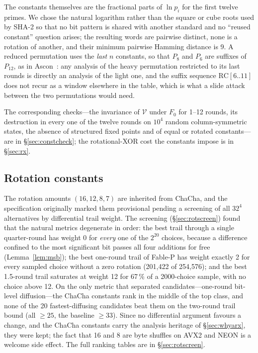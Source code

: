 \documentclass{iacrtrans}
\newcommand{\FableP}{\textsf{Fable-P}\xspace}
\newcommand{\ChaCha}{\textsf{ChaCha}\xspace}
\newcommand{\PP}[1]{P_{#1}}
\newcommand{\WuncTwo}{33}    %
\begin{document}
The constants themselves are the fractional parts of $\ln p_i$ for the first twelve primes. We chose the natural logarithm rather than the square or cube roots used by SHA-2 so that no bit pattern is shared with another standard and no ``reused constant'' question arises; the resulting words are pairwise distinct, none is a rotation of another, and their minimum pairwise Hamming distance is 9. A reduced permutation uses the \emph{last} $n$ constants, so that $\PP{8}$ and $\PP{6}$ are suffixes of $\PP{12}$, as in Ascon~\cite{Ascon21}: any analysis of the heavy permutation restricted to its last rounds is directly an analysis of the light one, and the suffix sequence $\mathrm{RC}[6..11]$ does not recur as a window elsewhere in the table, which is what a slide attack between the two permutations would need.

The corresponding checks---the invariance of $\mathcal{V}$ under $F_0$ for 1--12 rounds, its destruction in every one of the twelve rounds on $10^4$ random column-symmetric states, the absence of structured fixed points and of equal or rotated constants---are in \S\ref{sec:constcheck}; the rotational-XOR cost the constants impose is in \S\ref{sec:rx}.

\subsection{Rotation constants}
\label{sec:whyrot}
The rotation amounts $(16,12,8,7)$ are inherited from \ChaCha, and the specification originally marked them provisional pending a screening of all $32^4$ alternatives by differential trail weight. The screening (\S\ref{sec:rotscreen}) found that the natural metrics degenerate in order: the best trail through a single quarter-round has weight 0 for \emph{every} one of the $2^{20}$ choices, because a difference confined to the most significant bit passes all four additions for free (Lemma~\ref{lem:msb}); the best one-round trail of \FableP has weight exactly 2 for every sampled choice without a zero rotation (201,422 of 254,576); and the best 1.5-round trail saturates at weight 12 for 67\,\% of a 2000-choice sample, with no choice above 12. On the only metric that separated candidates---one-round bit-level diffusion---the \ChaCha constants rank in the middle of the top class, and none of the 20 fastest-diffusing candidates beat them on the two-round trail bound (all $\geq 25$, the baseline $\geq \WuncTwo$). Since no differential argument favours a change, and the \ChaCha constants carry the analysis heritage of \S\ref{sec:whyarx}, they were kept; the fact that 16 and 8 are byte shuffles on AVX2 and NEON is a welcome side effect. The full ranking tables are in \S\ref{sec:rotscreen}.
\end{document}
